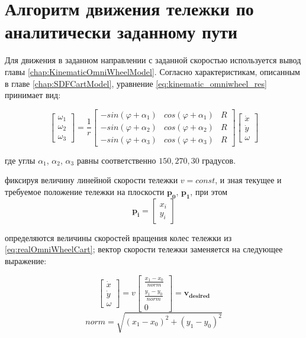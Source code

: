\documentclass[oneside,final,14pt]{extreport}
\newcommand{\bs}{\boldsymbol}
\begin{document}
\section{Алгоритм движения тележки по аналитически заданному пути}
\label{chap:cartMovingAlg}
Для движения в заданном направлении с заданной скоростью используется вывод главы \ref{chap:KinematicOmniWheelModel}. Согласно характеристикам, описанным в главе \ref{chap:SDFCartModel}, уравнение \ref{eq:kinematic_omniwheel_res} принимает вид:

\begin{equation}
\label{eq:realOmniWheelCart}
\begin{bmatrix}
\omega_{1} \\
\omega_{2} \\
\omega_{3}
\end{bmatrix}
=
\frac{1}{r}
\begin{bmatrix}
-sin(\varphi +\alpha_{1}) &
cos(\varphi +\alpha_{1}) &
R
\\
-sin(\varphi +\alpha_{2}) &
cos(\varphi +\alpha_{2}) &
R
\\
-sin(\varphi +\alpha_{3}) &
cos(\varphi +\alpha_{3}) &
R
\end{bmatrix}
\begin{bmatrix}
\dot{x} \\
\dot{y} \\
\omega
\end{bmatrix}
\end{equation}

где углы $\alpha_1$, $\alpha_2$, $\alpha_3$ равны соответственно $150, 270, 30$ градусов.

фиксируя величину линейной скорости тележки $v = const$, и зная текущее и требуемое положение тележки на плоскости $\bs{p_0}$, $\bs{p_1}$, при этом  
\begin{equation}
\bs{p_i} 
= 
\begin{bmatrix}
x_i
\\
y_i
\end{bmatrix} 
\end{equation}

определяются величины скоростей вращения колес тележки из \ref{eq:realOmniWheelCart}; вектор скорости тележки заменяется на следующее выражение:

\begin{equation}
\begin{bmatrix}
\dot{x} \\
\dot{y} \\
\omega
\end{bmatrix}
=
v
\begin{bmatrix}
\frac{x_1 - x_0}{norm} \\
\frac{y_1 - y_0}{norm} \\
0
\end{bmatrix}
=
\bs{v_{desired}}
\end{equation}
\begin{equation}
norm = \sqrt{(x_1 - x_0)^2 + (y_1 -y_0)^2}
\end{equation}
\end{document}
